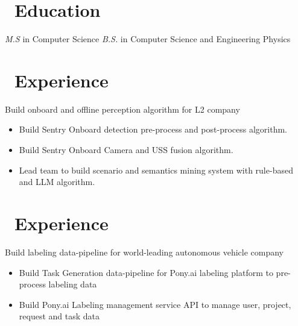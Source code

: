 \documentclass{resume}
\begin{document}



\section{\faGraduationCap\ Education}
\textit{M.S} in Computer Science
\textit{B.S.} in Computer Science and Engineering Physics

\section{\faUsers\ Experience}
Build onboard and offline perception algorithm for L2 company
\begin{itemize}
  \item Build Sentry Onboard detection pre-process and post-process algorithm.
  \item Build Sentry Onboard Camera and USS fusion algorithm.
  \item Lead team to build scenario and semantics mining system with rule-based and LLM algorithm.
\end{itemize}


\section{\faUsers\ Experience}
Build labeling data-pipeline for world-leading autonomous vehicle company
\begin{itemize}
  \item Build Task Generation data-pipeline for Pony.ai labeling platform to pre-process labeling data
  \item Build Pony.ai Labeling management service API to manage user, project, request and task data
\end{itemize}
\end{document}
